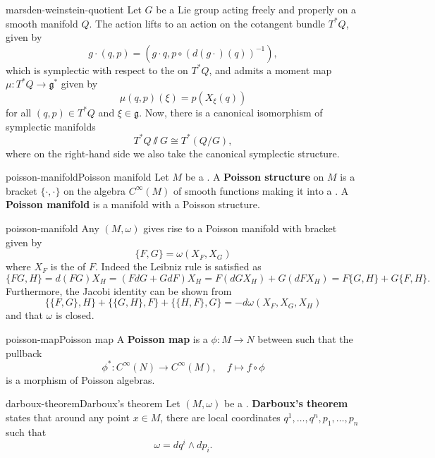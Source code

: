 \begin{example}{marsden-weinstein-quotient}
    Let $G$ be a Lie group acting freely and properly on a smooth manifold $Q$. The action lifts to an action on the cotangent bundle $T^* Q$, given by
    \[ g \cdot (q, p) = (g \cdot q, p \circ (d(g \cdot)(q))^{-1} ) , \]
    which is symplectic with respect to the  on $T^*Q$, and admits a moment map $\mu : T^*Q \to \mathfrak{g}^*$ given by
    \[ \mu(q, p)(\xi) = p(X_\xi(q)) \]
    for all $(q, p) \in T^*Q$ and $\xi \in \mathfrak{g}$. Now, there is a canonical isomorphism of symplectic manifolds
    \[ T^*Q \sslash G \cong T^*(Q / G) , \]
    where on the right-hand side we also take the canonical symplectic structure. %
\end{example}

\begin{topic}{poisson-manifold}{Poisson manifold}
    Let $M$ be a . A \textbf{Poisson structure} on $M$ is a bracket $\{ \cdot, \cdot \}$ on the algebra $C^\infty(M)$ of smooth functions making it into a . A \textbf{Poisson manifold} is a manifold with a Poisson structure.
\end{topic}

\begin{example}{poisson-manifold}
    Any  $(M, \omega)$ gives rise to a Poisson manifold with bracket given by
    \[ \{ F, G \} = \omega(X_F, X_G) \]
    where $X_F$ is the  of $F$.
    Indeed the Leibniz rule is satisfied as
    \[ \{ FG, H \} = d(FG) X_H = (F d G + G d F) X_H = F (d G X_H) + G (d F X_H) = F \{ G, H \} + G \{ F, H \} . \]
    Furthermore, the Jacobi identity can be shown from
    \[ \{ \{ F, G \}, H \} + \{ \{ G, H \}, F \} + \{ \{ H, F \}, G \} = -d \omega(X_F, X_G, X_H) \]
    and that $\omega$ is closed.
\end{example}

\begin{topic}{poisson-map}{Poisson map}
    A \textbf{Poisson map} is a  $\phi : M \to N$ between  such that the pullback
    \[ \phi^* : C^\infty(N) \to C^\infty(M), \quad f \mapsto f \circ \phi \]
    is a morphism of Poisson algebras.
\end{topic}

\begin{topic}{darboux-theorem}{Darboux's theorem}
    Let $(M, \omega)$ be a . \textbf{Darboux's theorem} states that around any point $x \in M$, there are local coordinates $q^1, \ldots, q^n, p_1, \ldots, p_n$ such that
    \[ \omega = dq^i \wedge dp_i . \]
\end{topic}

